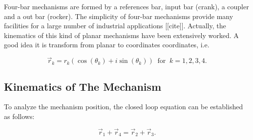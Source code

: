 \documentclass[12pt,letterpape]{article}
\begin{document}
Four-bar mechanisms are formed by a references bar, input bar (crank), a coupler and a out bar (rocker). The simplicity of four-bar mechanisms provide many facilities for a large number of industrial applications [[cite]]. Actually, the kinematics of this kind of planar mechanisms have been extensively worked. A good idea it is transform from planar to coordinates coordinates, i.e.

\begin{equation}
	\vec{r}_k = r_k ( \cos(\theta_k) + i \sin( \theta_k ) ) \ \text{ for } \ k = 1,2,3,4.
	\label{eqn:rpolar}
\end{equation}

\subsection{Kinematics of The Mechanism} %
\label{sub:kinematics_of_the_mechanism}

To analyze the mechanism position, the closed loop equation can be established as follows:

\begin{equation}
	\vec{r}_1 + \vec{r}_4 = \vec{r}_2 + \vec{r}_3.
	\label{eqn:sumsr}
\end{equation}
\end{document}
